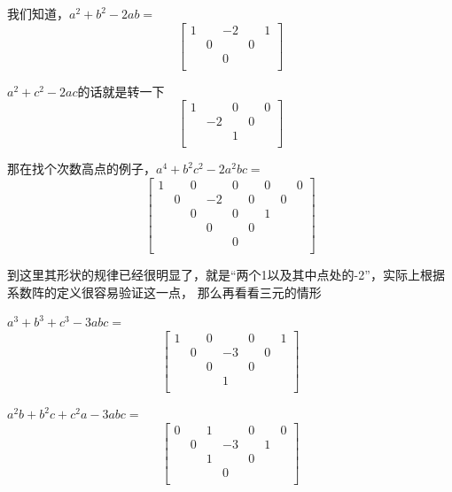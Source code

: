\documentclass[UTF8]{ctexart}
\begin{document}
我们知道，$ a^{2}+b^{2}-2ab= $
\renewcommand*{\arraystretch}{1.732}\[\left[\begin{matrix}
	1& & -2& &1 \\
	& 0& &0 & \\
	& & 0& & \\
\end{matrix}\right]\]

$ a^{2}+c^{2}-2ac $的话就是转一下
\renewcommand*{\arraystretch}{1.732}\[\left[\begin{matrix}
	1& & 0& &0 \\
	& -2& &0 & \\
	& & 1& & \\
\end{matrix}\right]\]

那在找个次数高点的例子，$ a^{4}+b^{2}c^{2}-2a^{2}bc= $
\renewcommand*{\arraystretch}{1.732}\[\left[\begin{matrix}
	1& & 0& &0& & 0& &0\\
    & 0& & -2&&0 & & 0&\\
    & & 0& &0& & 1& &\\
    & & & 0&& 0& & &\\
    & & & &0& & & &\\
\end{matrix}\right]\]

到这里其形状的规律已经很明显了，就是“两个1以及其中点处的-2”，实际上根据系数阵的定义很容易验证这一点，
那么再看看三元的情形

$ a^{3}+b^{3}+c^{3}-3abc= $
\renewcommand*{\arraystretch}{1.732}\[\left[\begin{matrix}
	1& & 0& &0& & 1\\
	& 0& & -3& &0 &\\
	& & 0& &0& & \\
	& & & 1& & &\\
\end{matrix}\right]\]

$ a^{2}b+b^{2}c+c^{2}a-3abc= $
\renewcommand*{\arraystretch}{1}\[\left[\begin{matrix}
	0& & 1& &0& & 0\\
	& 0& & -3& &1 &\\
	& & 1& &0& & \\
	& & & 0& & &\\
\end{matrix}\right]\]
\end{document}
